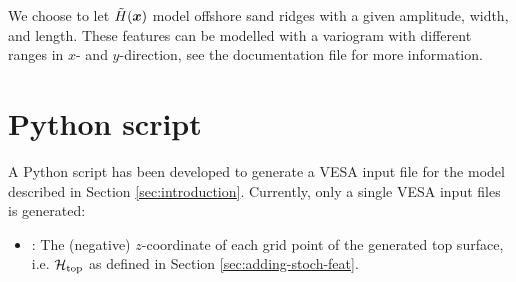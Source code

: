 \documentclass[11pt,a4paper]{amsart}
\begin{document}
We choose to let $\tilde{H}(\boldsymbol{x})$ model 
offshore sand ridges \cite{nil12:imp} with a given amplitude, width, and
length. These features can be modelled with a variogram with different ranges
in $x$- and $y$-direction, see the documentation file
\docVariogram{} for more information.

\section{Python script}
A Python script has been developed to generate a VESA
\cite{gas09:ver} input file for the model described in Section \ref{sec:introduction}.
Currently, only a single VESA input files is generated:
\begin{itemize}
\item {} : The (negative) $z$-coordinate of each grid point of
  the generated top surface, i.e. $\mathcal{H}_{\text{top}}$ as defined in Section
  \ref{sec:adding-stoch-feat}. 
\end{itemize}
\end{document}
